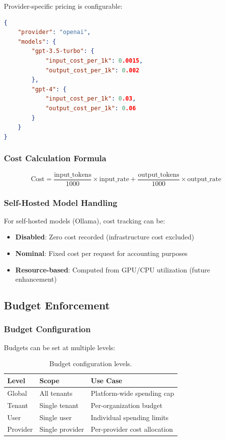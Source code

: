 Provider-specific pricing is configurable:

\begin{lstlisting}[language=json,caption={Provider pricing configuration.}]
{
    "provider": "openai",
    "models": {
        "gpt-3.5-turbo": {
            "input_cost_per_1k": 0.0015,
            "output_cost_per_1k": 0.002
        },
        "gpt-4": {
            "input_cost_per_1k": 0.03,
            "output_cost_per_1k": 0.06
        }
    }
}
\end{lstlisting}

\subsubsection{Cost Calculation Formula}

\begin{equation}
\text{Cost} = \frac{\text{input\_tokens}}{1000} \times \text{input\_rate} + \frac{\text{output\_tokens}}{1000} \times \text{output\_rate}
\end{equation}

\subsubsection{Self-Hosted Model Handling}

For self-hosted models (Ollama), cost tracking can be:

\begin{itemize}
    \item \textbf{Disabled}: Zero cost recorded (infrastructure cost excluded)
    \item \textbf{Nominal}: Fixed cost per request for accounting purposes
    \item \textbf{Resource-based}: Computed from GPU/CPU utilization (future enhancement)
\end{itemize}

\subsection{Budget Enforcement}

\subsubsection{Budget Configuration}

Budgets can be set at multiple levels:

\begin{table}[ht]
\centering
\caption{Budget configuration levels.}
\label{tab:budget-levels}
\small
\begin{tabular}{llp{5cm}}
\hline
\textbf{Level} & \textbf{Scope} & \textbf{Use Case} \\
\hline
Global & All tenants & Platform-wide spending cap \\
Tenant & Single tenant & Per-organization budget \\
User & Single user & Individual spending limits \\
Provider & Single provider & Per-provider cost allocation \\
\hline
\end{tabular}
\end{table}

